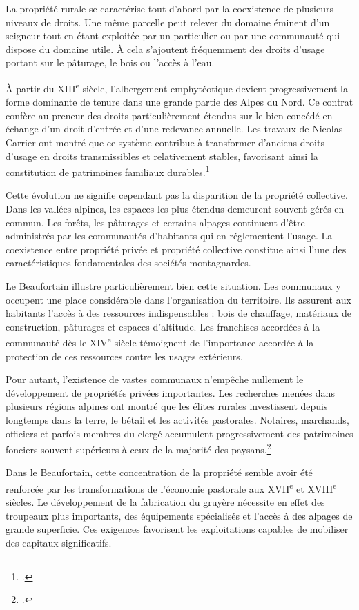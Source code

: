 \documentclass[12pt,a4paper]{report}
\begin{document}
La propriété rurale se caractérise tout d'abord par la coexistence de plusieurs niveaux de droits. Une même parcelle peut relever du domaine éminent d'un seigneur tout en étant exploitée par un particulier ou par une communauté qui dispose du domaine utile. À cela s'ajoutent fréquemment des droits d'usage portant sur le pâturage, le bois ou l'accès à l'eau.

À partir du XIII\textsuperscript{e} siècle, l'albergement emphytéotique devient progressivement la forme dominante de tenure dans une grande partie des Alpes du Nord. Ce contrat confère au preneur des droits particulièrement étendus sur le bien concédé en échange d'un droit d'entrée et d'une redevance annuelle. Les travaux de Nicolas Carrier ont montré que ce système contribue à transformer d'anciens droits d'usage en droits transmissibles et relativement stables, favorisant ainsi la constitution de patrimoines familiaux durables.\footcite[308--312]{Carrier2001VieMontagnardeFaucigny}

Cette évolution ne signifie cependant pas la disparition de la propriété collective. Dans les vallées alpines, les espaces les plus étendus demeurent souvent gérés en commun. Les forêts, les pâturages et certains alpages continuent d'être administrés par les communautés d'habitants qui en réglementent l'usage. La coexistence entre propriété privée et propriété collective constitue ainsi l'une des caractéristiques fondamentales des sociétés montagnardes.

Le Beaufortain illustre particulièrement bien cette situation. Les communaux y occupent une place considérable dans l'organisation du territoire. Ils assurent aux habitants l'accès à des ressources indispensables : bois de chauffage, matériaux de construction, pâturages et espaces d'altitude. Les franchises accordées à la communauté dès le XIV\textsuperscript{e} siècle témoignent de l'importance accordée à la protection de ces ressources contre les usages extérieurs.

Pour autant, l'existence de vastes communaux n'empêche nullement le développement de propriétés privées importantes. Les recherches menées dans plusieurs régions alpines ont montré que les élites rurales investissent depuis longtemps dans la terre, le bétail et les activités pastorales. Notaires, marchands, officiers et parfois membres du clergé accumulent progressivement des patrimoines fonciers souvent supérieurs à ceux de la majorité des paysans.\footcite[488]{Carrier2001VieMontagnardeFaucigny}

Dans le Beaufortain, cette concentration de la propriété semble avoir été renforcée par les transformations de l'économie pastorale aux XVII\textsuperscript{e} et XVIII\textsuperscript{e} siècles. Le développement de la fabrication du gruyère nécessite en effet des troupeaux plus importants, des équipements spécialisés et l'accès à des alpages de grande superficie. Ces exigences favorisent les exploitations capables de mobiliser des capitaux significatifs.
\end{document}
